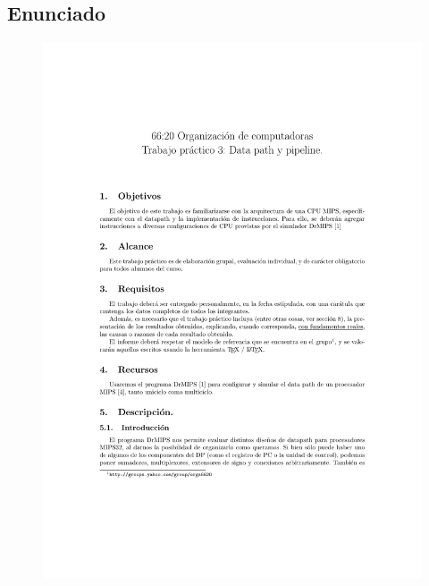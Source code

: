 \documentclass[a4paper, 12pt]{article}
\begin{document}
	\subsection{Enunciado}

	\begin{figure}[H]
		\centering
		\includegraphics[scale=1, page = 1, clip, trim=1.2in 36mm 20mm 1.5in]{files/tp3-c2-2018.pdf}
	\end{figure}
	
\end{document}
